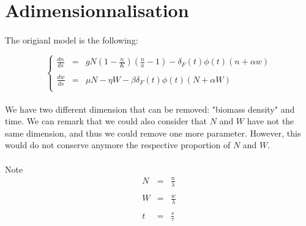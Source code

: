 \documentclass{article}
\begin{document}
\newpage
{}
%
%
%


%




\newpage
\appendix
{}

\newpage
\section{Adimensionnalisation}
\label{adim}

\paragraph{}
The origianl model is the following:

\[
\left\lbrace
\begin{array}{rcl}
\frac{dn}{ds} & = & gN(1-\frac{n}{K})(\frac{n}{a}-1) - \delta_F(t)\phi(t)(n+\alpha w) \\
\\
\frac{dw}{ds} & = & \mu N - \eta W - \beta\delta_F(t)\phi(t)(N+\alpha W) \\
\end{array}
\right.
\]

\paragraph{}
We have two different dimension that can be removed: "biomass density" and time. We can remark that we could also consider that $N$ and $W$ have not the same dimension, and thus we could remove one more parameter. However, this would do not conserve anymore the respective proportion of $N$ and $W$.

\paragraph{}
Note
\[
\begin{array}{rcl}
N & = & \frac{n}{\lambda} \\
\\
W & = & \frac{w}{\lambda} \\
\\
t & = & \frac{s}{\tau} \\
\end{array}
\]
\end{document}
